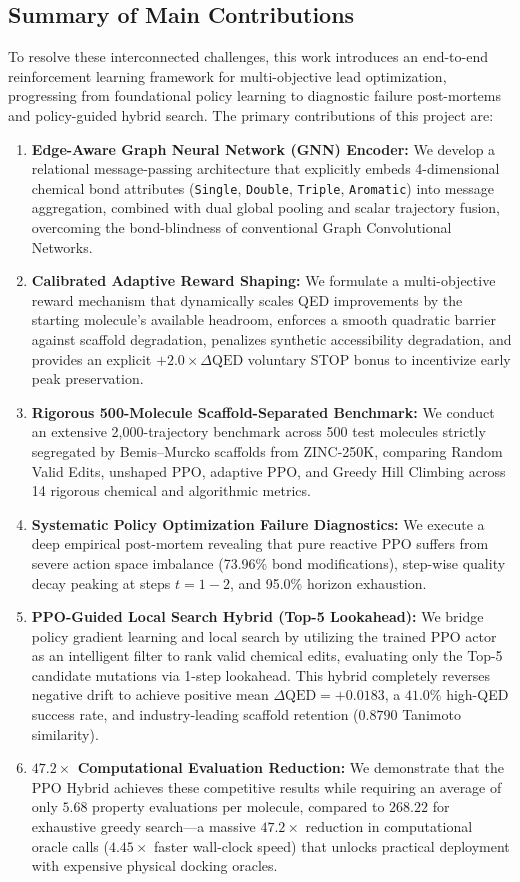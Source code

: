 \documentclass{ieeeaccess}
\begin{document}
\subsection{Summary of Main Contributions}
To resolve these interconnected challenges, this work introduces an end-to-end reinforcement learning framework for multi-objective lead optimization, progressing from foundational policy learning to diagnostic failure post-mortems and policy-guided hybrid search. The primary contributions of this project are:
\begin{enumerate}
    \item \textbf{Edge-Aware Graph Neural Network (GNN) Encoder:} We develop a relational message-passing architecture that explicitly embeds 4-dimensional chemical bond attributes (\texttt{Single}, \texttt{Double}, \texttt{Triple}, \texttt{Aromatic}) into message aggregation, combined with dual global pooling and scalar trajectory fusion, overcoming the bond-blindness of conventional Graph Convolutional Networks.
    \item \textbf{Calibrated Adaptive Reward Shaping:} We formulate a multi-objective reward mechanism that dynamically scales QED improvements by the starting molecule's available headroom, enforces a smooth quadratic barrier against scaffold degradation, penalizes synthetic accessibility degradation, and provides an explicit $+2.0\times\Delta\text{QED}$ voluntary STOP bonus to incentivize early peak preservation.
    \item \textbf{Rigorous 500-Molecule Scaffold-Separated Benchmark:} We conduct an extensive 2,000-trajectory benchmark across 500 test molecules strictly segregated by Bemis--Murcko scaffolds from ZINC-250K, comparing Random Valid Edits, unshaped PPO, adaptive PPO, and Greedy Hill Climbing across 14 rigorous chemical and algorithmic metrics.
    \item \textbf{Systematic Policy Optimization Failure Diagnostics:} We execute a deep empirical post-mortem revealing that pure reactive PPO suffers from severe action space imbalance (73.96\% bond modifications), step-wise quality decay peaking at steps $t=1-2$, and 95.0\% horizon exhaustion.
    \item \textbf{PPO-Guided Local Search Hybrid (Top-5 Lookahead):} We bridge policy gradient learning and local search by utilizing the trained PPO actor as an intelligent filter to rank valid chemical edits, evaluating only the Top-5 candidate mutations via 1-step lookahead. This hybrid completely reverses negative drift to achieve positive mean $\Delta\text{QED} = +0.0183$, a $41.0\%$ high-QED success rate, and industry-leading scaffold retention ($0.8790$ Tanimoto similarity).
    \item \textbf{$47.2\times$ Computational Evaluation Reduction:} We demonstrate that the PPO Hybrid achieves these competitive results while requiring an average of only $5.68$ property evaluations per molecule, compared to $268.22$ for exhaustive greedy search---a massive $47.2\times$ reduction in computational oracle calls ($4.45\times$ faster wall-clock speed) that unlocks practical deployment with expensive physical docking oracles.
\end{enumerate}
\end{document}
